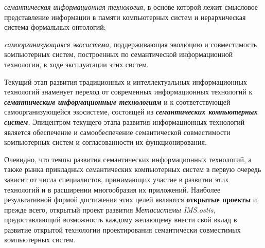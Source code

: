 \begin{SCn}
{\begin{scnitemize}
    \item \textit{семантическая информационная технология}, в основе которой лежит смысловое представление информации в памяти компьютерных систем и иерархическая система формальных онтологий;
    \item \textit{cамоорганизующаяся экосистема}, поддерживающая эволюцию и совместимость компьютерных систем, построенных по семантической информационной технологии, в ходе эксплуатации этих систем.
\end{scnitemize}

Текущий этап развития традиционных и интеллектуальных информационных технологий знаменует переход от современных информационных технологий к \textit{\textbf{семантическим информационным технологиям}} и к соответствующей самоорганизующейся экосистеме, состоящей из \textit{\textbf{семантических компьютерных систем}}. Эпицентром текущего этапа развития информационных технологий является обеспечение и самообеспечение семантической совместимости компьютерных систем и согласованности их функционирования.

Очевидно, что темпы развития семантических информационных технологий, а также рынка прикладных семантических компьютерных систем в первую очередь зависит от числа специалистов, принимающих участие в развитии этих технологий и в расширении многообразия их приложений. Наиболее результативной формой достижения этих целей являются \textbf{открытые проекты} и, прежде всего, открытый проект развития \textit{Метасистемы IMS.ostis}, предоставляющий возможность каждому желающему внести свой вклад в развитие открытой технологии проектирования семантически совместимых компьютерных систем.}

\scnendstruct

\end{SCn}
